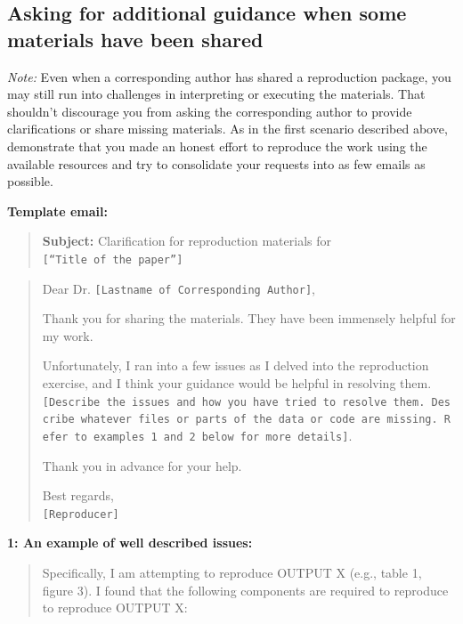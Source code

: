 \documentclass[]{book}
\begin{document}
\hypertarget{asking-for-additional-guidance-when-some-materials-have-been-shared}{%
\subsection{Asking for additional guidance when some materials have been shared}\label{asking-for-additional-guidance-when-some-materials-have-been-shared}}

\emph{Note:} Even when a corresponding author has shared a reproduction package, you may still run into challenges in interpreting or executing the materials. That shouldn't discourage you from asking the corresponding author to provide clarifications or share missing materials. As in the first scenario described above, demonstrate that you made an honest effort to reproduce the work using the available resources and try to consolidate your requests into as few emails as possible.

\textbf{Template email:}

\begin{quote}
\textbf{Subject:} Clarification for reproduction materials for \texttt{{[}“Title\ of\ the\ paper”{]}}
\end{quote}

\begin{quote}
Dear Dr. \texttt{{[}Lastname\ of\ Corresponding\ Author{]}},

Thank you for sharing the materials. They have been immensely helpful for my work.

Unfortunately, I ran into a few issues as I delved into the reproduction exercise, and I think your guidance would be helpful in resolving them. \texttt{{[}Describe\ the\ issues\ and\ how\ you\ have\ tried\ to\ resolve\ them.\ Describe\ whatever\ files\ or\ parts\ of\ the\ data\ or\ code\ are\ missing.\ Refer\ to\ examples\ 1\ and\ 2\ below\ for\ more\ details{]}}.

Thank you in advance for your help.

Best regards,\\
\texttt{{[}Reproducer{]}}
\end{quote}

\textbf{1: An example of well described issues:}

\begin{quote}
Specifically, I am attempting to reproduce OUTPUT X (e.g., table 1, figure 3). I found that the following components are required to reproduce to reproduce OUTPUT X:
\end{quote}
\end{document}
